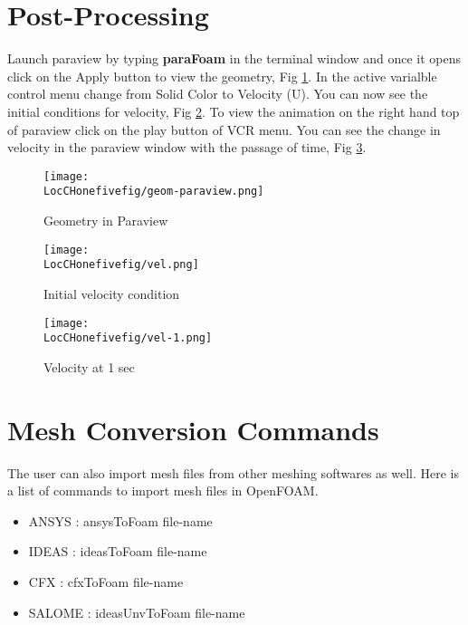 \section{Post-Processing}

Launch paraview by typing \textbf{paraFoam} in the terminal window and once it opens click on the Apply button to view the geometry, Fig \ref{geom}.
In the active varialble control menu change from Solid Color to Velocity (U). You can now see the initial conditions for velocity, Fig \ref{vel}.
To view the animation on the right hand top of paraview click on the play button of VCR menu. You can see the change in velocity in the paraview 
window with the passage of time, Fig \ref {vel-1}.

\begin{figure}[h]  
\centering
\texttt{[image: \\LocCHonefivefig/geom-paraview.png]}
\caption{Geometry in Paraview}
\label{geom}
\end{figure}

\begin{figure}[h]  
\centering
\texttt{[image: \\LocCHonefivefig/vel.png]}
\caption{Initial velocity condition}
\label{vel}
\end{figure}

\begin{figure}[h]  
\centering
\texttt{[image: \\LocCHonefivefig/vel-1.png]}
\caption{Velocity at 1 sec}
\label{vel-1}
\end{figure}

\section{Mesh Conversion Commands}

The user can also import mesh files from other meshing softwares as well. Here is a list of commands to import mesh files in OpenFOAM.

\begin{itemize}
\item ANSYS : ansysToFoam file-name
\item IDEAS : ideasToFoam file-name
\item CFX : cfxToFoam file-name
\item SALOME : ideasUnvToFoam file-name
\end{itemize}


